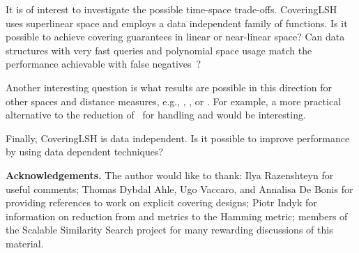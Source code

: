 \documentclass[prodmode,acmtalg]{acmsmall}
\begin{document}
It is of interest to investigate the possible time-space trade-offs.
CoveringLSH uses superlinear space and employs a data independent family of functions. 
Is it possible to achieve covering guarantees in linear or near-linear space?
Can data structures with very fast queries and polynomial space usage match the performance achievable with false negatives~\cite{DBLP:journals/corr/Laarhoven15a}?

Another interesting question is what results are possible in this direction for other spaces and distance measures, e.g., , , or .
For example, a more practical alternative to the reduction of~\cite{DBLP:conf/stoc/Indyk07} for handling  and  would be interesting.

Finally, CoveringLSH is data independent. Is it possible to improve performance by using data dependent techniques?


\medskip

{\bf Acknowledgements.} The author would like to thank: Ilya Razenshteyn for useful comments; Thomas Dybdal Ahle, Ugo Vaccaro, and Annalisa De Bonis for providing references to work on explicit covering designs; Piotr Indyk for information on reduction from  and  metrics to the Hamming metric; members of the Scalable Similarity Search project for many rewarding discussions of this material.

\newpage



\end{document}
